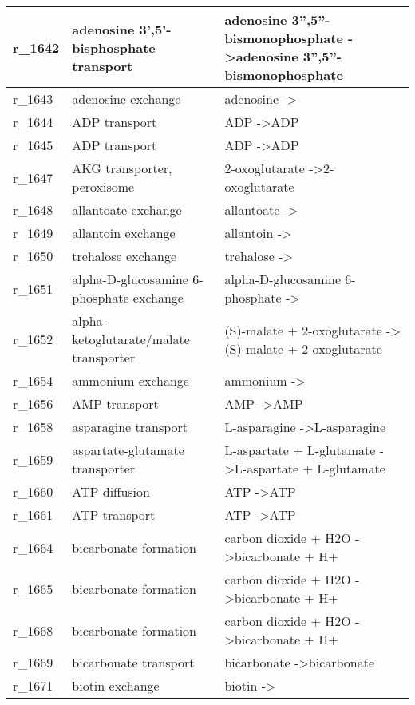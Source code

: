 \begin{landscape}
{\begin{longtable}{|l|p{7cm}|p{15cm}|}
r\_1642 & adenosine 3',5'-bisphosphate transport & adenosine 3'',5''-bismonophosphate  -\textgreater adenosine 3'',5''-bismonophosphate \\ \hline
r\_1643 & adenosine exchange & adenosine  -\textgreater{} \\ \hline
r\_1644 & ADP transport & ADP  -\textgreater ADP \\ \hline
r\_1645 & ADP transport & ADP  -\textgreater ADP \\ \hline
r\_1647 & AKG transporter, peroxisome & 2-oxoglutarate  -\textgreater 2-oxoglutarate \\ \hline
r\_1648 & allantoate exchange & allantoate  -\textgreater{} \\ \hline
r\_1649 & allantoin exchange & allantoin  -\textgreater{} \\ \hline
r\_1650 & trehalose exchange & trehalose  -\textgreater{} \\ \hline
r\_1651 & alpha-D-glucosamine 6-phosphate exchange & alpha-D-glucosamine 6-phosphate  -\textgreater{} \\ \hline
r\_1652 & alpha-ketoglutarate/malate transporter & (S)-malate + 2-oxoglutarate  -\textgreater (S)-malate + 2-oxoglutarate \\ \hline
r\_1654 & ammonium exchange & ammonium  -\textgreater{} \\ \hline
r\_1656 & AMP transport & AMP  -\textgreater AMP \\ \hline
r\_1658 & asparagine transport & L-asparagine  -\textgreater L-asparagine \\ \hline
r\_1659 & aspartate-glutamate transporter & L-aspartate + L-glutamate  -\textgreater L-aspartate + L-glutamate \\ \hline
r\_1660 & ATP diffusion & ATP  -\textgreater ATP \\ \hline
r\_1661 & ATP transport & ATP  -\textgreater ATP \\ \hline
r\_1664 & bicarbonate formation & carbon dioxide + H2O  -\textgreater bicarbonate + H+ \\ \hline
r\_1665 & bicarbonate formation & carbon dioxide + H2O  -\textgreater bicarbonate + H+ \\ \hline
r\_1668 & bicarbonate formation & carbon dioxide + H2O  -\textgreater bicarbonate + H+ \\ \hline
r\_1669 & bicarbonate transport & bicarbonate  -\textgreater bicarbonate \\ \hline
r\_1671 & biotin exchange & biotin  -\textgreater{} \\ \hline

\end{longtable}}
\end{landscape}

